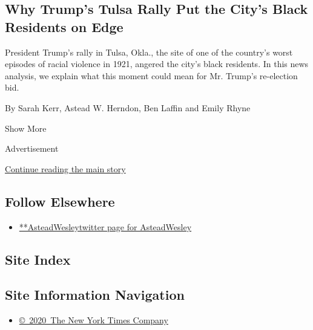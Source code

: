 \begin{enumerate}
{  \subsection{Why Trump's Tulsa Rally Put the City's Black Residents on
  Edge}\label{why-trumps-tulsa-rally-put-the-citys-black-residents-on-edge}}

  President Trump's rally in Tulsa, Okla., the site of one of the
  country's worst episodes of racial violence in 1921, angered the
  city's black residents. In this news analysis, we explain what this
  moment could mean for Mr. Trump's re-election bid.

  By Sarah Kerr, Astead W. Herndon, Ben Laffin and Emily Rhyne
\end{enumerate}

Show More

Advertisement

\protect\hyperlink{after-mid2}{Continue reading the main story}

\hypertarget{follow-elsewhere}{%
\subsection{Follow Elsewhere}\label{follow-elsewhere}}

\begin{itemize}
\tightlist
\item
  \href{https://twitter.com/AsteadWesley}{**AsteadWesleytwitter page for
  AsteadWesley}
\end{itemize}

\hypertarget{site-index}{%
\subsection{Site Index}\label{site-index}}

\hypertarget{site-information-navigation}{%
\subsection{Site Information
Navigation}\label{site-information-navigation}}

\begin{itemize}
\tightlist
\item
  \href{https://help.nytimes.com/hc/en-us/articles/115014792127-Copyright-notice}{©~2020~The
  New York Times Company}
\end{itemize}

